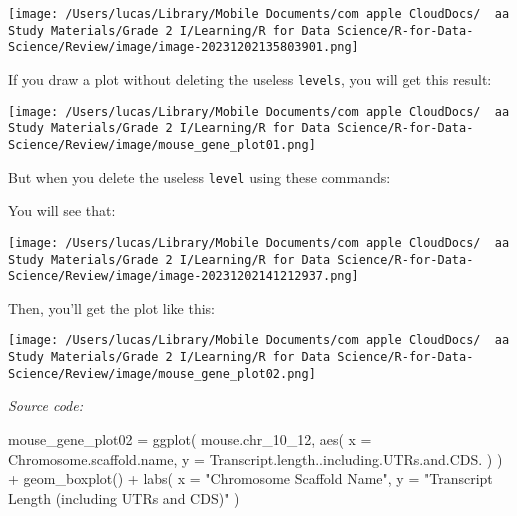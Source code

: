 \documentclass[
]{article}
\newenvironment{Shaded}{}{}
\newcommand{\AttributeTok}[1]{\textcolor[rgb]{0.49,0.56,0.16}{#1}}
\newcommand{\FunctionTok}[1]{\textcolor[rgb]{0.02,0.16,0.49}{#1}}
\newcommand{\NormalTok}[1]{#1}
\newcommand{\OtherTok}[1]{\textcolor[rgb]{0.00,0.44,0.13}{#1}}
\newcommand{\SpecialCharTok}[1]{\textcolor[rgb]{0.25,0.44,0.63}{#1}}
\newcommand{\StringTok}[1]{\textcolor[rgb]{0.25,0.44,0.63}{#1}}
\begin{document}
\texttt{[image: /Users/lucas/Library/Mobile Documents/com~apple~CloudDocs/~~aa Study Materials/Grade 2 I/Learning/R for Data Science/R-for-Data-Science/Review/image/image-20231202135803901.png]}

If you draw a plot without deleting the useless \texttt{levels}, you
will get this result:

\texttt{[image: /Users/lucas/Library/Mobile Documents/com~apple~CloudDocs/~~aa Study Materials/Grade 2 I/Learning/R for Data Science/R-for-Data-Science/Review/image/mouse\_gene\_plot01.png]}

But when you delete the useless \texttt{level} using these commands:

\begin{Shaded}
\end{Shaded}

You will see that:

\texttt{[image: /Users/lucas/Library/Mobile Documents/com~apple~CloudDocs/~~aa Study Materials/Grade 2 I/Learning/R for Data Science/R-for-Data-Science/Review/image/image-20231202141212937.png]}

Then, you'll get the plot like this:

\texttt{[image: /Users/lucas/Library/Mobile Documents/com~apple~CloudDocs/~~aa Study Materials/Grade 2 I/Learning/R for Data Science/R-for-Data-Science/Review/image/mouse\_gene\_plot02.png]}

\emph{Source code:}

\begin{Shaded}
\begin{Highlighting}[]
\NormalTok{mouse\_gene\_plot02 }\OtherTok{=}
  \FunctionTok{ggplot}\NormalTok{(}
\NormalTok{    mouse.chr\_10\_12,}
    \FunctionTok{aes}\NormalTok{(}
      \AttributeTok{x =}\NormalTok{ Chromosome.scaffold.name,}
      \AttributeTok{y =}\NormalTok{ Transcript.length..including.UTRs.and.CDS.}
\NormalTok{    )}
\NormalTok{  ) }\SpecialCharTok{+}
  \FunctionTok{geom\_boxplot}\NormalTok{() }\SpecialCharTok{+}
  \FunctionTok{labs}\NormalTok{(}
    \AttributeTok{x =} \StringTok{"Chromosome Scaffold Name"}\NormalTok{,}
    \AttributeTok{y =} \StringTok{"Transcript Length (including UTRs and CDS)"}
\NormalTok{  )}
\end{Highlighting}
\end{Shaded}
\end{document}
